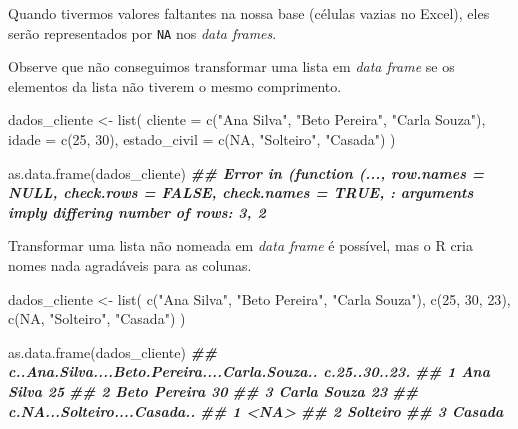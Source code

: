\documentclass[
]{book}
\newenvironment{Shaded}{\begin{snugshade}}{\end{snugshade}}
\newcommand{\AttributeTok}[1]{\textcolor[rgb]{0.77,0.63,0.00}{#1}}
\newcommand{\ConstantTok}[1]{\textcolor[rgb]{0.00,0.00,0.00}{#1}}
\newcommand{\DecValTok}[1]{\textcolor[rgb]{0.00,0.00,0.81}{#1}}
\newcommand{\DocumentationTok}[1]{\textcolor[rgb]{0.56,0.35,0.01}{\textbf{\textit{#1}}}}
\newcommand{\FunctionTok}[1]{\textcolor[rgb]{0.00,0.00,0.00}{#1}}
\newcommand{\NormalTok}[1]{#1}
\newcommand{\OtherTok}[1]{\textcolor[rgb]{0.56,0.35,0.01}{#1}}
\newcommand{\StringTok}[1]{\textcolor[rgb]{0.31,0.60,0.02}{#1}}
\begin{document}
Quando tivermos valores faltantes na nossa base (células vazias no Excel), eles serão representados por \texttt{NA} nos \emph{data frames}.

Observe que não conseguimos transformar uma lista em \emph{data frame} se os elementos da lista não tiverem o mesmo comprimento.

\begin{Shaded}
\begin{Highlighting}[]
\NormalTok{dados\_cliente }\OtherTok{\textless{}{-}} \FunctionTok{list}\NormalTok{(}
  \AttributeTok{cliente =} \FunctionTok{c}\NormalTok{(}\StringTok{"Ana Silva"}\NormalTok{, }\StringTok{"Beto Pereira"}\NormalTok{, }\StringTok{"Carla Souza"}\NormalTok{),}
  \AttributeTok{idade =} \FunctionTok{c}\NormalTok{(}\DecValTok{25}\NormalTok{, }\DecValTok{30}\NormalTok{),}
  \AttributeTok{estado\_civil =} \FunctionTok{c}\NormalTok{(}\ConstantTok{NA}\NormalTok{, }\StringTok{"Solteiro"}\NormalTok{, }\StringTok{"Casada"}\NormalTok{)}
\NormalTok{)}

\FunctionTok{as.data.frame}\NormalTok{(dados\_cliente)}
\DocumentationTok{\#\# Error in (function (..., row.names = NULL, check.rows = FALSE, check.names = TRUE, : arguments imply differing number of rows: 3, 2}
\end{Highlighting}
\end{Shaded}

Transformar uma lista não nomeada em \emph{data frame} é possível, mas o R cria nomes nada agradáveis para as colunas.

\begin{Shaded}
\begin{Highlighting}[]
\NormalTok{dados\_cliente }\OtherTok{\textless{}{-}} \FunctionTok{list}\NormalTok{(}
  \FunctionTok{c}\NormalTok{(}\StringTok{"Ana Silva"}\NormalTok{, }\StringTok{"Beto Pereira"}\NormalTok{, }\StringTok{"Carla Souza"}\NormalTok{),}
  \FunctionTok{c}\NormalTok{(}\DecValTok{25}\NormalTok{, }\DecValTok{30}\NormalTok{, }\DecValTok{23}\NormalTok{),}
  \FunctionTok{c}\NormalTok{(}\ConstantTok{NA}\NormalTok{, }\StringTok{"Solteiro"}\NormalTok{, }\StringTok{"Casada"}\NormalTok{)}
\NormalTok{)}

\FunctionTok{as.data.frame}\NormalTok{(dados\_cliente)}
\DocumentationTok{\#\#   c..Ana.Silva....Beto.Pereira....Carla.Souza.. c.25..30..23.}
\DocumentationTok{\#\# 1                                     Ana Silva            25}
\DocumentationTok{\#\# 2                                  Beto Pereira            30}
\DocumentationTok{\#\# 3                                   Carla Souza            23}
\DocumentationTok{\#\#   c.NA...Solteiro....Casada..}
\DocumentationTok{\#\# 1                        \textless{}NA\textgreater{}}
\DocumentationTok{\#\# 2                    Solteiro}
\DocumentationTok{\#\# 3                      Casada}
\end{Highlighting}
\end{Shaded}
\end{document}
